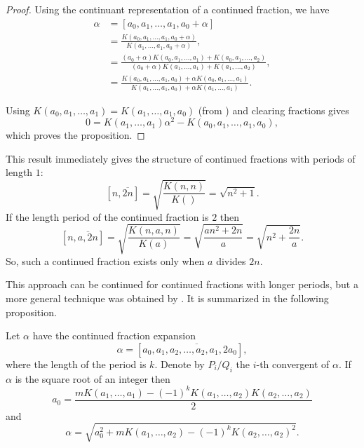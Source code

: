 \begin{proof}
Using the continuant representation of a continued fraction, we have 
\[
\begin{aligned}
  \alpha & = [a_0, a_1, \ldots, a_1, a_0 + \alpha] \\
    & = \frac{K(a_0, a_1, \ldots, a_1, a_0 + \alpha)}{K(a_1, \ldots,
a_1, a_0 + \alpha)}, \\
  & = \frac{(a_0 + \alpha) K(a_0, a_1, \ldots, a_1)+K(a_0, a_1,
\ldots, a_2)}{(a_0+\alpha) K(a_1, \ldots,a_1) + K(a_1, \ldots, a_2)}, \\
  & = \frac{K(a_0, a_1, \ldots, a_1, a_0) + \alpha K(a_0, a_1, \ldots,
a_1)}{K(a_1, \ldots, a_1, a_0) + \alpha K(a_1, \ldots, a_1)}.
\end{aligned}
\]

Using $K(a_0, a_1, \ldots, a_1) = K(a_1, \ldots, a_1, a_0)$ (from
) and clearing fractions gives
\[
0 =  K(a_1, \ldots, a_1) \alpha^2 - K(a_0, a_1, \ldots, a_1, a_0),
\]
which proves the proposition.
\end{proof}

This result immediately gives the structure of continued fractions
with periods of length $1$:
\[
[n, \overline{2n}] = \sqrt{\frac{K(n,n)}{K()}} = \sqrt{n^2+1}.
\]
If the length period of the continued fraction is $2$ then 
\[
[n, \overline{a, 2n}] = \sqrt{\frac{K(n,a,n)}{K(a)}} =
\sqrt{\frac{an^2+2n}{a}}
= \sqrt{n^2+\frac{2n}{a}}.
\]
So, such a continued fraction exists only when $a$ divides $2n$.

This approach can be continued for continued fractions with longer
periods, but a more general technique was obtained by {\MuirT}
\cite{Muir:Surds:74}.  It is summarized in the following proposition.

\begin{proposition}[Muir] \label{CF:Muir:Prop}
Let $\alpha$ have the continued fraction expansion
\[
\alpha = [a_0, \overline{a_1, a_2, \ldots, a_2, a_1, 2a_0}],
\]
where the length of the period is $k$.  Denote by $P_i/Q_i$ the $i$-th
convergent of $\alpha$.  If $\alpha$ is the square root of an integer
then
\[
a_0 = \frac{m K(a_1, \ldots, a_1) 
            - (-1)^k K(a_1, \ldots, a_2) K(a_2,\ldots, a_2)}{2}
\]
and
\[
\alpha = \sqrt{a_0^2 + m K(a_1, \ldots, a_2) - (-1)^k K(a_2, \ldots, a_2)^2}.
\]
\end{proposition}

